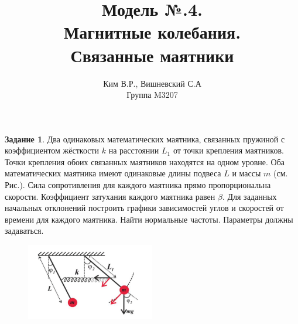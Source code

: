 \documentclass[a4paper,12pt]{article}
\title{Модель №.4. \\ Магнитные колебания. \\ Связанные маятники }
\author{Ким В.Р., Вишневский С.А \\ Группа M3207 }
\date{}
\theoremstyle{definition}
\newtheorem*{task}{Задание}\setlength{\parindent}{0pt}
\begin{document}
\maketitle

\begin{task}
    Два одинаковых математических маятника, связанных пружиной с коэффициентом 
    жёсткости \(k\) на расстоянии \(L_1\) от точки крепления маятников. 
    Точки крепления обоих связанных маятников находятся на одном уровне. 
    Оба математических маятника имеют одинаковые длины подвеса \(L\) и массы \(m\) 
    (см. Рис.). 
    Сила сопротивления для каждого маятника прямо пропорциональна скорости. 
    Коэффициент затухания каждого маятника равен \(\beta\). Для заданных начальных 
    отклонений построить графики зависимостей углов и скоростей от времени 
    для каждого маятника. Найти нормальные частоты. 
    Параметры должны задаваться.

    \begin{figure}[H]
        \centering
        \includegraphics[width=0.5\textwidth]{"4. Connected pendulum/task.png"}  
    \end{figure}

\end{task}
\end{document}
